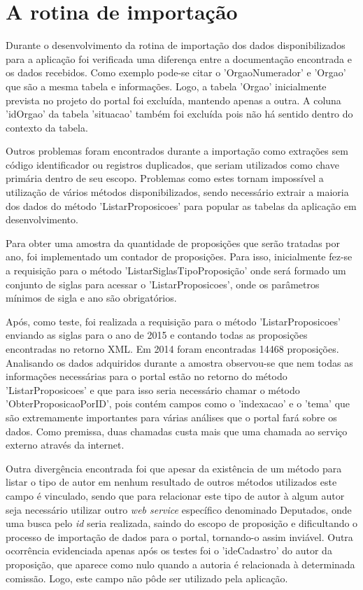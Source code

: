 \documentclass[
	12pt,				%
	openright,			%
	twoside,			%
	a4paper,			%
	english,			%
	french,				%
	spanish,			%
	brazil				%
	]{abntex2}
\begin{document}
\section{A rotina de importação}
Durante o desenvolvimento da rotina de importação dos dados disponibilizados para a aplicação foi verificada 
uma diferença entre a documentação encontrada e os dados recebidos. Como exemplo pode-se citar o 'OrgaoNumerador' e 'Orgao' que são a mesma
tabela e informações. Logo, a tabela 'Orgao' inicialmente prevista no projeto do portal foi excluída, mantendo apenas a outra. A 
coluna 'idOrgao' da tabela 'situacao' também foi excluída pois não há sentido dentro do contexto da tabela.

Outros problemas foram encontrados durante a importação como extrações sem código identificador ou registros duplicados, que seriam
utilizados como chave primária dentro de seu escopo. Problemas como estes tornam impossível a utilização
de vários métodos disponibilizados, sendo necessário extrair a maioria dos dados do método 'ListarProposicoes' para popular 
as tabelas da aplicação em desenvolvimento.

Para obter uma amostra da quantidade de proposições que serão tratadas por ano, foi implementado um contador de proposições. 
Para isso, inicialmente fez-se a requisição para o método 'ListarSiglasTipoProposição' onde será formado um conjunto de siglas
para acessar o 'ListarProposicoes', onde os parâmetros mínimos de sigla e ano são obrigatórios.

Após, como teste, foi realizada a requisição para o método 'ListarProposicoes' enviando as siglas para o ano de 2015 e contando
todas as proposições encontradas no retorno XML. Em 2014 foram encontradas 14468 proposições. Analisando os dados adquiridos durante a 
amostra observou-se que nem todas as informações necessárias para o portal estão no retorno do método 'ListarProposicoes' e que para 
isso seria necessário chamar o método 'ObterProposicaoPorID', pois contém campos como o 'indexacao' e o 'tema' que são 
extremamente importantes para várias análises que o portal fará sobre os dados. Como premissa, duas chamadas custa mais 
que uma chamada ao serviço externo através da internet. 

Outra divergência encontrada foi que apesar da existência de um método para listar o tipo de autor em nenhum 
resultado de outros métodos utilizados este campo é vinculado, sendo que para relacionar este tipo de autor à 
algum autor seja necessário utilizar outro \emph{web service} específico denominado Deputados, onde uma busca pelo \emph{id} 
seria realizada, saindo do escopo de proposição e dificultando o processo de importação de dados para o portal, tornando-o 
assim inviável. Outra ocorrência evidenciada apenas após os testes foi o 'ideCadastro' do autor da proposição, 
que aparece como nulo quando a autoria é relacionada à determinada comissão. Logo, este campo não pôde ser utilizado pela aplicação.
\end{document}
